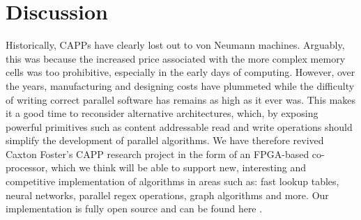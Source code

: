 \section{Discussion}
Historically, CAPPs have clearly lost out to von Neumann machines. Arguably, this was because the increased price associated with the more complex memory cells was too prohibitive, especially in the early days of computing. However, over the years, manufacturing and designing costs have plummeted while the difficulty of writing correct parallel software has remains as high as it ever was. This makes it a good time to reconsider alternative architectures, which, by exposing powerful primitives such as content addressable read and write operations should simplify the development of parallel algorithms. We have therefore revived Caxton Foster's CAPP research project in the form of an FPGA-based co-processor, which we think will be able to support new, interesting and competitive implementation of algorithms in areas such as: fast lookup tables, neural networks, parallel regex operations, graph algorithms and more. Our implementation is fully open source and can be found here \cite{CAPP_FPGA}.